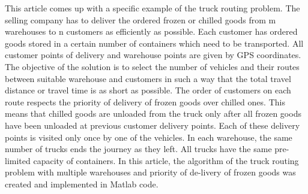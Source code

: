 
\begin{Abstrakt}
    This article comes up with a specific example of the truck routing problem. The selling company has to deliver the ordered frozen or chilled goods from m warehouses to n customers as efficiently as possible. Each customer has ordered goods stored in a certain number of containers which need to be transported. All customer points of delivery and warehouse points are given by GPS coordinates. The objective of the solution is to select the number of vehicles and their routes between suitable warehouse and customers in such a way that the total travel distance or travel time is as short as possible. The order of customers on each route respects the priority of delivery of frozen goods over chilled ones. This means that chilled goods are unloaded from the truck only after all frozen goods have been unloaded at previous customer delivery points. Each of these delivery points is visited only once by one of the vehicles. In each warehouse, the same number of trucks ends the journey as they left. All trucks have the same pre-limited capacity of containers. In this article, the algorithm of the truck routing problem with multiple warehouses and priority of de-livery of frozen goods was created and implemented in Matlab code.
\end{Abstrakt}



\clearpage